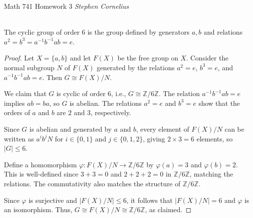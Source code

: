 \documentclass{article}
\def\zz{{\mathbb Z}}
\begin{document}
\begin{center}
    Math 741
    \hfill Homework 3
    \hfill \textit{Stephen Cornelius}
\end{center}



\begin{problem}[1.9.6] \\ 
    The cyclic group of order $6$ is the group defined by generators $a,b$ and relations $a^2 = b^3 = a^{-1}b^{-1}ab = e$.
\end{problem}

\begin{proof}
    Let $X = \{a, b\}$ and let $F(X)$ be the free group on $X$. Consider the normal subgroup $N$ of $F(X)$ generated by the relations $a^2 = e$, $b^3 = e$, and $a^{-1}b^{-1}ab = e$. Then $G \cong F(X)/N$.

    We claim that $G$ is cyclic of order $6$, i.e., $G \cong \zz/6\zz$. The relation $a^{-1}b^{-1}ab = e$ implies $ab = ba$, so $G$ is abelian. The relations $a^2 = e$ and $b^3 = e$ show that the orders of $a$ and $b$ are $2$ and $3$, respectively.

    Since $G$ is abelian and generated by $a$ and $b$, every element of $F(X)/N$ can be written as $a^i b^j N$ for $i \in \{0,1\}$ and $j \in \{0,1,2\}$, giving $2 \times 3 = 6$ elements, so $|G| \leq 6$.

    Define a homomorphism $\varphi: F(X)/N \to \zz/6\zz$ by $\varphi(a) = 3$ and $\varphi(b) = 2$. This is well-defined since $3 + 3 = 0$ and $2 + 2 + 2 = 0$ in $\zz/6\zz$, matching the relations. The commutativity also matches the structure of $\zz/6\zz$.

    Since $\varphi$ is surjective and $|F(X)/N| \leq 6$, it follows that $|F(X)/N| = 6$ and $\varphi$ is an isomorphism. Thus, $G \cong F(X)/N \cong \zz/6\zz$, as claimed.
\end{proof}


\end{document}
